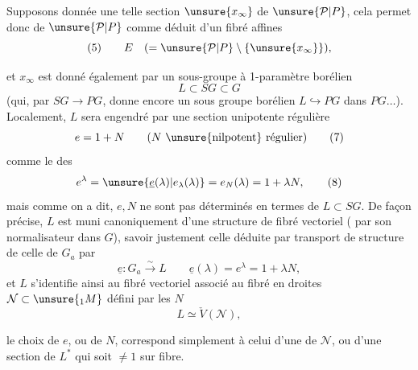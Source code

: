 Supposons donnée une telle section $\unsure{x_\infty}$ de $\unsure{\mathcal P|P}$, cela permet donc de   $\unsure{\mathcal P|P}$ comme déduit d'un fibré  affines
\[
(5)\qquad E\quad(=\unsure{\mathcal P|P}\setminus\{\unsure{x_\infty}\}),
\]



et $x_\infty$ est donné également par un sous-groupe à 1-paramètre borélien
\[
L\subset SG\subset G \tag{6}
\]
(qui, par $SG\longrightarrow PG$, donne encore un sous groupe  borélien $L\hookrightarrow PG$ dans $PG\ldots$). Localement, $L$ sera engendré par une section unipotente régulière
\[
e=1+N\qquad (N\text{ \unsure{nilpotent} régulier}) \tag{7}
\]
comme le  des
\[
e^\lambda=\unsure{\underline e(\lambda)|e_{\lambda}(\lambda)}=e_N(\lambda)=1+\lambda N, \tag{8}
\]
mais comme on a dit, $e,N$ ne sont pas déterminés  en termes de $L\subset SG$. De façon précise, $L$ est muni canoniquement d'une structure de fibré vectoriel ( par son normalisateur dans $G$),   savoir justement celle déduite par transport de structure de celle de $G_a$ par
\[
\underline e:G_a\xrightarrow{\sim}L\qquad
\underline e(\lambda)=e^\lambda=1+\lambda N,
\]
et  $L$ s'identifie ainsi au fibré vectoriel  associé au fibré en droites $\mathcal N\subset\unsure{{}_1M}$  défini par les $N$
\[
L\simeq\check V(\mathcal N), \tag{9}
\]


le choix de $e$, ou de $N$, correspond simplement à celui d'une   de $\mathcal N$, ou d'une section  de $L^*$   qui soit $\ne1$ sur  fibre.


